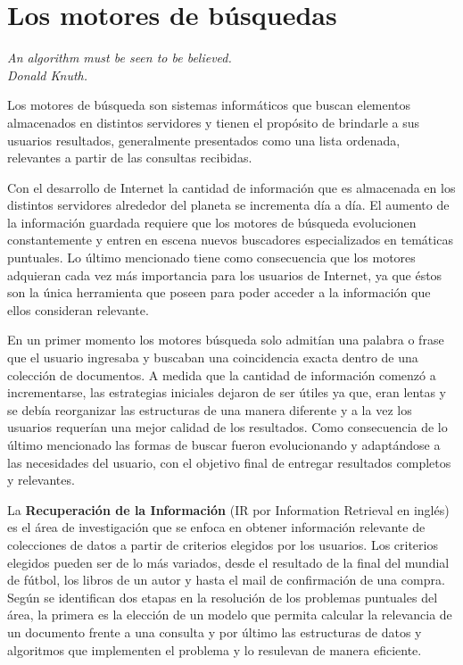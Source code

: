 \section{Los motores de búsquedas}
{\begin{small}%
\begin{flushright}%
\it An algorithm must be seen to be believed.\\Donald Knuth.
\end{flushright}%
\end{small}%
\vspace{.5cm}}
Los motores de búsqueda son sistemas informáticos que buscan elementos almacenados en distintos servidores y tienen el propósito de brindarle a sus usuarios resultados, generalmente presentados como una lista ordenada, relevantes a partir de las consultas recibidas.

Con el desarrollo de Internet la cantidad de información que es almacenada en los distintos servidores alrededor del planeta se incrementa día a día. El aumento de la información guardada requiere que los motores de búsqueda evolucionen constantemente y entren en escena nuevos buscadores especializados en temáticas puntuales. Lo último mencionado tiene como consecuencia que los motores adquieran cada vez más importancia para los usuarios de Internet, ya que éstos son la única herramienta que poseen para poder acceder a la información que ellos consideran relevante.

En un primer momento los motores búsqueda solo admitían una palabra o frase que el usuario ingresaba y buscaban una coincidencia exacta dentro de una colección de documentos. A medida que la cantidad de información comenzó a incrementarse, las estrategias iniciales dejaron de ser útiles ya que, eran lentas y se debía reorganizar las estructuras de una manera diferente y a la vez los usuarios requerían una mejor calidad de los resultados. Como consecuencia de lo último mencionado las formas de buscar fueron evolucionando y adaptándose a las necesidades del usuario, con el objetivo final de entregar resultados completos y relevantes.

La \textbf{Recuperación de la Información} (IR por Information Retrieval en inglés) \cite{Baeza-Yates:1999:MIR:553876,Manning:2008:IIR:1394399,Zobel:2006:IFT:1132956.1132959} es el área de investigación que se enfoca en obtener información relevante de colecciones de datos a partir de criterios elegidos por los usuarios. Los criterios elegidos pueden ser de lo más variados, desde el resultado de la final del mundial de fútbol, los libros de un autor y hasta el mail de confirmación de una compra. Según \cite{Baeza-Yates:1999:MIR:553876} se identifican dos etapas en la resolución de los problemas puntuales del área, la primera es la elección de un modelo que permita calcular la relevancia de un documento frente a una consulta y por último las estructuras de datos y algoritmos que implementen el problema y lo resulevan de manera eficiente.

